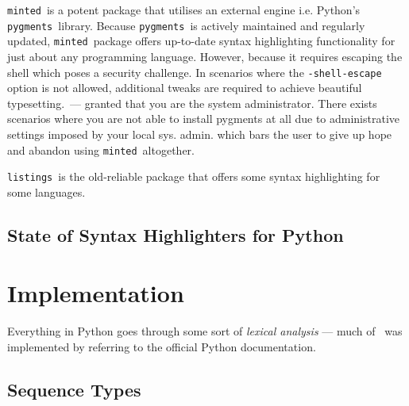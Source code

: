 \documentclass[oneside]{syntexpydoc}
\def\Mnt{\texttt{minted}}
\def\Pyg{\texttt{pygments}}
\def\Lst{\texttt{listings}}
\begin{document}
\Mnt\footnotemark\ is a potent package that utilises an external engine i.e. Python's \Pyg \footnotemark\ library. Because \Pyg\ is actively maintained and regularly updated, \Mnt\ package offers up-to-date syntax highlighting functionality for just about any programming language. However, because it requires escaping the shell which poses a security challenge. In scenarios where the \verb|-shell-escape| option is not allowed, additional tweaks are required to achieve beautiful typesetting.\footnotemark~--- granted that you are the system administrator. There exists scenarios where you are not able to install pygments at all due to administrative settings imposed by your local sys. admin. which bars the user to give up hope and abandon using \Mnt\ altogether.

\Lst\footnotemark\ is the old-reliable package that offers some syntax highlighting for some languages. 


\section{State of Syntax Highlighters for Python}
\subsection{}

\chapter{Implementation}
Everything in Python goes through some sort of \emph{lexical analysis} --- much of \SynTeXpy\ was implemented by referring to the official Python \faPython{} documentation.

\section{Sequence Types}
\end{document}
